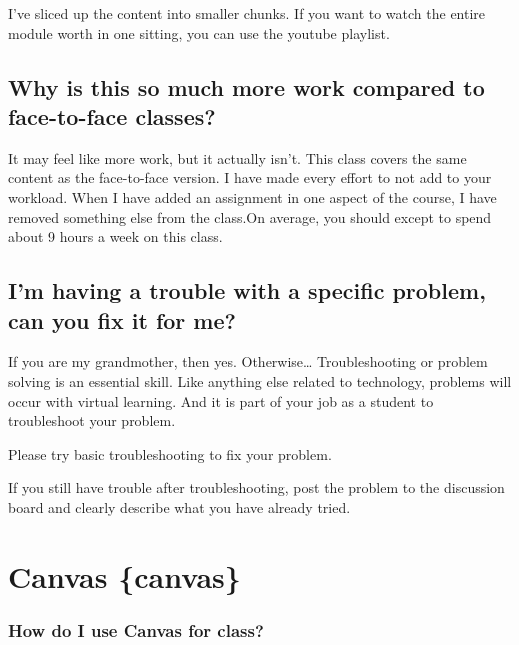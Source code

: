 I've sliced up the content into smaller chunks.
If you want to watch the entire module worth in one sitting, you can use the youtube playlist.

\hypertarget{why-is-this-so-much-more-work-compared-to-face-to-face-classes}{%
\subsection{Why is this so much more work compared to face-to-face classes?}\label{why-is-this-so-much-more-work-compared-to-face-to-face-classes}}

It may feel like more work, but it actually isn't. This class covers the same content as the face-to-face version. I have made every effort to not add to your workload. When I have added an assignment in one aspect of the course, I have removed something else from the class.On average, you should except to spend about 9 hours a week on this class.

\hypertarget{im-having-a-trouble-with-a-specific-problem-can-you-fix-it-for-me}{%
\subsection{I'm having a trouble with a specific problem, can you fix it for me?}\label{im-having-a-trouble-with-a-specific-problem-can-you-fix-it-for-me}}

If you are my grandmother, then yes. Otherwise\ldots{} Troubleshooting or problem solving is an essential skill. Like anything else related to technology, problems will occur with virtual learning. And it is part of your job as a student to troubleshoot your problem.

Please try basic troubleshooting to fix your problem.

If you still have trouble after troubleshooting, post the problem to the discussion board and clearly describe what you have already tried.

\hypertarget{canvas-canvas}{%
\section{Canvas \{canvas\}}\label{canvas-canvas}}

\hypertarget{how-do-i-use-canvas-for-class}{%
\subsubsection{How do I use Canvas for class?}\label{how-do-i-use-canvas-for-class}}


